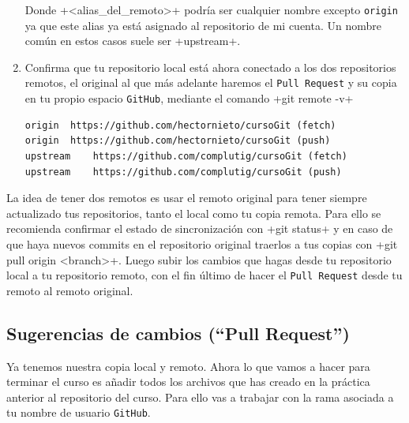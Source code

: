 \documentclass[a5paper, oneside,10pt]{article}
\begin{document}
\begin{enumerate}
   Donde \cverb+<alias_del_remoto>+ podría ser cualquier nombre excepto \verb+origin+ ya que este alias ya está asignado al repositorio de mi cuenta. Un nombre común en estos casos suele ser \cverb+upstream+.
   
   \item Confirma que tu repositorio local está ahora conectado a los dos repositorios remotos, el original al que más adelante haremos el \verb+Pull Request+ y su copia en tu propio espacio \verb+GitHub+, mediante el comando \cverb+git remote -v+
  
    \begin{lstlisting}[style=custom]   
origin	https://github.com/hectornieto/cursoGit (fetch)
origin	https://github.com/hectornieto/cursoGit (push)
upstream	https://github.com/complutig/cursoGit (fetch)
upstream	https://github.com/complutig/cursoGit (push)
    \end{lstlisting}
    \end{enumerate}
    
    La idea de tener dos remotos es usar el remoto original para tener siempre actualizado tus repositorios, tanto el  local como tu copia remota. Para ello se recomienda confirmar el estado de sincronización con \cverb+git status+ y en caso de que haya nuevos commits en el repositorio original traerlos a tus copias con \cverb+git pull origin <branch>+. Luego subir los cambios que hagas desde tu repositorio local a tu repositorio remoto, con el fin último de hacer el \verb+Pull Request+ desde tu remoto al remoto original.

    \subsection{Sugerencias de cambios (``Pull Request'')}
    Ya tenemos nuestra copia local y remoto. Ahora lo que vamos a hacer para terminar el curso es añadir todos los archivos que has creado en la práctica anterior al repositorio del curso. Para ello vas a trabajar con la rama asociada a tu nombre de usuario \verb+GitHub+.
    
\end{document}
